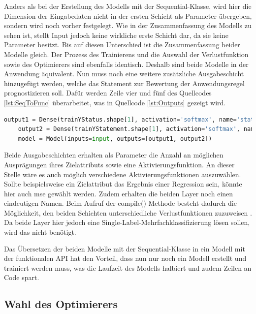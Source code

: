 Anders als bei der Erstellung des Modells mit der \glqq Sequential\grqq{}-Klasse, wird hier die Dimension der Eingabedaten nicht in der ersten Schicht als Parameter übergeben,
sondern wird noch vorher festgelegt. Wie in der Zusammenfassung des Modells zu sehen ist, stellt \glqq Input\grqq{} jedoch keine wirkliche erste Schicht dar,
da sie keine Parameter besitzt. Bis auf diesen Unterschied ist die Zusammenfassung beider Modelle gleich. Der Prozess des Trainierens und die Auswahl der Verlustfunktion
sowie des Optimierers sind ebenfalls identisch. Deshalb sind beide Modelle in der Anwendung äquivalent. Nun muss noch eine weitere zusätzliche Ausgabeschicht hinzugefügt werden,
welche das Statement zur Bewertung der Anwendungsregel prognostizieren soll. Dafür werden Zeile vier und fünf des Quellcodes \ref*{lst:SeqToFunc} überarbeitet, was 
in Quellcode \ref*{lst:Outputs} gezeigt wird.

\begin{lstlisting}[language = python, caption={Zweite Ausgabeschicht hinzufügen},captionpos=b, label = lst:Outputs, floatplacement=H]
    output1 = Dense(trainYStatus.shape[1], activation='softmax', name='status')(x)
    output2 = Dense(trainYStatement.shape[1], activation='softmax', name='statement')(x)
    model = Model(inputs=input, outputs=[output1, output2])
\end{lstlisting}

Beide Ausgabeschichten erhalten als Parameter die Anzahl an möglichen Ausprägungen ihres Zielattributs sowie eine Aktivierungsfunktion. An dieser Stelle wäre es auch
möglich verschiedene Aktivierungsfunktionen auszuwählen. Sollte beispielsweise ein Zielattribut das Ergebnis einer Regression sein, könnte hier auch 
\glqq mse\grqq{} gewählt werden. Zudem erhalten die beiden Layer noch einen eindeutigen Namen. Beim Aufruf der compile()-Methode besteht dadurch die Möglichkeit,
den beiden Schichten unterschiedliche Verlustfunktionen zuzuweisen \cite[vgl. S.308f.]{DL_PY}. Da beide Layer hier jedoch eine Single-Label-Mehrfachklassifizierung lösen sollen,
wird das nicht benötigt. 

Das Übersetzen der beiden Modelle mit der \glqq Sequential\grqq{}-Klasse in ein Modell mit der funktionalen \ac{API} hat den Vorteil, dass nun nur noch ein Modell 
erstellt und trainiert werden muss, was die Laufzeit des Modells halbiert und zudem Zeilen an Code spart.

\subsection{Wahl des Optimierers}

